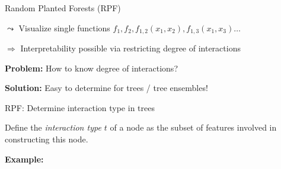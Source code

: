\documentclass[10pt,compress,t,notes=noshow, xcolor=table]{beamer}
\begin{document}
\begin{frame}{Random Planted Forests (RPF) }
\begin{itemize}
    $\leadsto$ Visualize single functions $f_1, f_2, f_{1,2}(x_{1}, x_{2}), f_{1,3}(x_{1}, x_{3}) \ldots$

    
\end{itemize}

$\Rightarrow$ Interpretability possible via restricting degree of interactions

\textbf{Problem:} How to know degree of interactions?

\textbf{Solution:} Easy to determine for trees / tree ensembles!

\end{frame}

\begin{frame}{RPF: Determine interaction type in trees}

Define the \textit{interaction type $t$} of a node as the subset of features involved in constructing this node.

\textbf{Example:}

\begin{center}
\end{center}
\end{frame}
\end{document}
